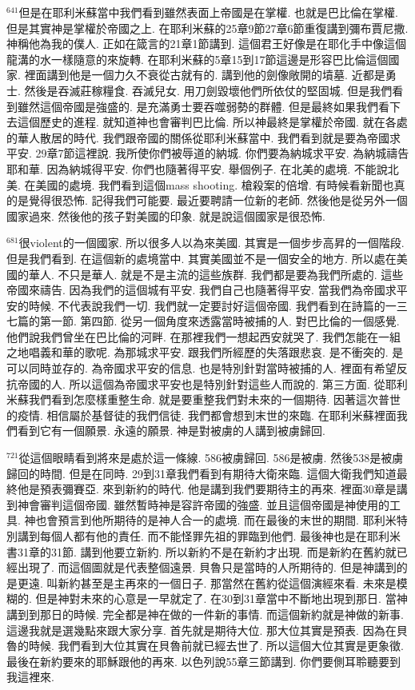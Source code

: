 \documentclass{book}
\begin{document}
$^{641}$但是在耶利米蘇當中我們看到雖然表面上帝國是在掌權.
也就是巴比倫在掌權.
但是其實神是掌權於帝國之上.
在耶利米蘇的25章9節27章6節重復講到彌布賈尼撒.
神稱他為我的僕人.
正如在箴言的21章1節講到.
這個君王好像是在耶化手中像這個龍溝的水一樣隨意的來旋轉.
在耶利米蘇的5章15到17節這邊是形容巴比倫這個國家.
裡面講到他是一個力久不衰從古就有的.
講到他的劍像敞開的墳墓.
近都是勇士.
然後是吞滅莊稼糧食.
吞滅兒女.
用刀劍毀壞他們所依仗的堅固城.
但是我們看到雖然這個帝國是強盛的.
是充滿勇士要吞噬弱勢的群體.
但是最終如果我們看下去這個歷史的進程.
就知道神也會審判巴比倫.
所以神最終是掌權於帝國.
就在各處的華人散居的時代.
我們跟帝國的關係從耶利米蘇當中.
我們看到就是要為帝國求平安.
29章7節這裡說.
我所使你們被辱道的納城.
你們要為納城求平安.
為納城禱告耶和華.
因為納城得平安.
你們也隨著得平安.
舉個例子.
在北美的處境.
不能說北美.
在美國的處境.
我們看到這個mass shooting.
槍殺案的倍增.
有時候看新聞也真的是覺得很恐怖.
記得我們可能要.
最近要聘請一位新的老師.
然後他是從另外一個國家過來.
然後他的孩子對美國的印象.
就是說這個國家是很恐怖.

$^{681}$很violent的一個國家.
所以很多人以為來美國.
其實是一個步步高昇的一個階段.
但是我們看到.
在這個新的處境當中.
其實美國並不是一個安全的地方.
所以處在美國的華人.
不只是華人.
就是不是主流的這些族群.
我們都是要為我們所處的.
這些帝國來禱告.
因為我們的這個城有平安.
我們自己也隨著得平安.
當我們為帝國求平安的時候.
不代表說我們一切.
我們就一定要討好這個帝國.
我們看到在詩篇的一三七篇的第一節.
第四節.
從另一個角度來透露當時被捕的人.
對巴比倫的一個感覺.
他們說我們曾坐在巴比倫的河畔.
在那裡我們一想起西安就哭了.
我們怎能在一組之地唱義和華的歌呢.
為那城求平安.
跟我們所經歷的失落跟悲哀.
是不衝突的.
是可以同時並存的.
為帝國求平安的信息.
也是特別針對當時被捕的人.
裡面有希望反抗帝國的人.
所以這個為帝國求平安也是特別針對這些人而說的.
第三方面.
從耶利米蘇我們看到怎麼樣重整生命.
就是要重整我們對未來的一個期待.
因著這次普世的疫情.
相信屬於基督徒的我們信徒.
我們都會想到末世的來臨.
在耶利米蘇裡面我們看到它有一個願景.
永遠的願景.
神是對被虜的人講到被虜歸回.

$^{721}$從這個眼睛看到將來是處於這一條線.
586被虜歸回.
586是被虜.
然後538是被虜歸回的時間.
但是在同時.
29到31章我們看到有期待大衛來臨.
這個大衛我們知道最終他是預表彌賽亞.
來到新約的時代.
他是講到我們要期待主的再來.
裡面30章是講到神會審判這個帝國.
雖然暫時神是容許帝國的強盛.
並且這個帝國是神使用的工具.
神也會預言到他所期待的是神人合一的處境.
而在最後的末世的期間.
耶利米特別講到每個人都有他的責任.
而不能怪罪先祖的罪臨到他們.
最後神也是在耶利米書31章的31節.
講到他要立新約.
所以新約不是在新約才出現.
而是新約在舊約就已經出現了.
而這個圖就是代表整個遠景.
貝魯只是當時的人所期待的.
但是神講到的是更遠.
叫新約甚至是主再來的一個日子.
那當然在舊約從這個演經來看.
未來是模糊的.
但是神對未來的心意是一早就定了.
在30到31章當中不斷地出現到那日.
當神講到到那日的時候.
完全都是神在做的一件新的事情.
而這個新約就是神做的新事.
這邊我就是選幾點來跟大家分享.
首先就是期待大位.
那大位其實是預表.
因為在貝魯的時候.
我們看到大位其實在貝魯前就已經去世了.
所以這個大位其實是更象徵.
最後在新約要來的耶穌跟他的再來.
以色列說55章三節講到.
你們要側耳聆聽要到我這裡來.
\end{document}
